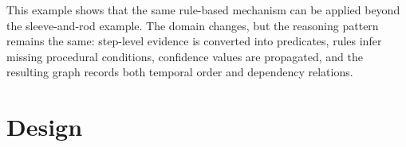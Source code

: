 This example shows that the same rule-based mechanism can be applied beyond the sleeve-and-rod example. The domain changes, but the reasoning pattern remains the same: step-level evidence is converted into predicates, rules infer missing procedural conditions, confidence values are propagated, and the resulting graph records both temporal order and dependency relations.






\chapter{Design}